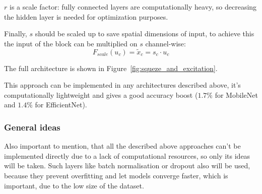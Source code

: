 $r$ is a scale factor: fully connected layers are computationally heavy, so decreasing the
hidden layer is needed for optimization purposes.

Finally, $s$ should be scaled up to save spatial dimensions of input, to achieve this the input of the block can be multiplied on $s$ channel-wise:
\[F_{scale}(u_c)=\widetilde{x}_c = s_c \cdot u_c\]

The full architecture is shown in Figure~\ref{fig:squeze_and_excitation}.

This approach can be implemented in any architectures described above, it's 
computationally lightweight and gives a good accuracy boost ($1.7\% $ for MobileNet 
and $1.4\%$ for EfficientNet).

\subsubsection{General ideas}
Also important to mention, that all the described above approaches can't be 
implemented directly due to a lack of computational resources, so only its ideas 
will be taken. Such layers like batch normalisation\cite{batch_norm} or dropout\cite{dropout} also will be used,
because they prevent overfitting and let models converge faster, which is important,
due to the low size of the dataset.
